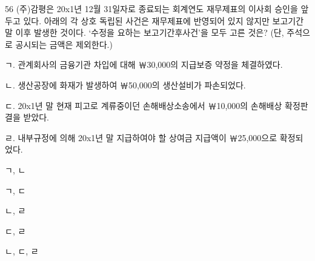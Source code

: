 \begin{question}{56}
(주)감평은 20x1년 12월 31일자로 종료되는 회계연도 재무제표의 이사회 승인을 앞두고 있다. 아래의 각 상호 독립된 사건은 재무제표에 반영되어 있지 않지만 보고기간말 이후 발생한 것이다. ‘수정을 요하는 보고기간후사건’을 모두 고른 것은? (단, 주석으로 공시되는 금액은 제외한다.)
\begin{framedtext}
ㄱ. 관계회사의 금융기관 차입에 대해 ￦30,000의 지급보증 약정을 체결하였다. \par
ㄴ. 생산공장에 화재가 발생하여 ￦50,000의 생산설비가 파손되었다. \par
ㄷ. 20x1년 말 현재 피고로 계류중이던 손해배상소송에서 ￦10,000의 손해배상 확정판결을 받았다. \par
ㄹ. 내부규정에 의해 20x1년 말 지급하여야 할 상여금 지급액이 ￦25,000으로 확정되었다. \par
\end{framedtext}
\begin{choices}
  \item ㄱ, ㄴ
  \item ㄱ, ㄷ
  \item ㄴ, ㄹ
  \item ㄷ, ㄹ
  \item ㄴ, ㄷ, ㄹ
\end{choices}
\end{question}
